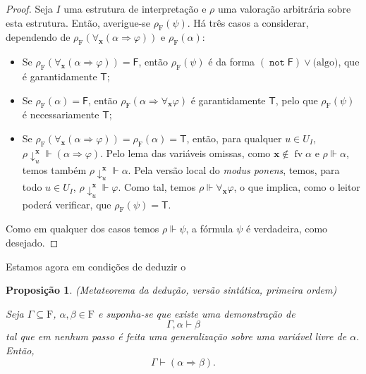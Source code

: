\documentclass{report}
\newtheorem{prop}{Proposição}
\theoremstyle{definition}
\theoremstyle{remark}
\renewcommand{\bf}[1]{\mathbf{#1}}
\newcommand{\F}{\mathrm{F}}
\newcommand{\lt}{\mathsf{T}}
\newcommand{\lf}{\mathsf{F}}
\DeclareMathOperator{\fv}{fv}
\DeclareMathOperator{\pnot}{\texttt{not}}
\newcommand{\imply}{\mathbin{\Rightarrow}}
\begin{document}
	\begin{proof}
	Seja $I$ uma estrutura de interpretação e $\rho$ uma valoração arbitrária sobre esta estrutura. Então, averigue-se $\rho_\F(\psi)$. Há três casos a considerar, dependendo de $\rho_\F(\forall_{\bf x}(\alpha \imply \varphi))$ e $\rho_\F(\alpha)$:
	
	\begin{itemize}
	\item Se $\rho_\F(\forall_{\bf x}(\alpha \imply \varphi)) = \lf$, então $\rho_\F(\psi)$ é da forma $(\pnot \lf) \lor \text{(algo)}$, que é garantidamente $\lt$;
	
	\item Se $\rho_\F(\alpha) = \lf$, então $\rho_\F(\alpha \imply \forall_{\bf x} \varphi)$ é garantidamente $\lt$, pelo que $\rho_\F(\psi)$ é necessariamente $\lt$;
	
	\item Se $\rho_\F(\forall_{\bf x}(\alpha \imply \varphi)) = \rho_\F(\alpha) = \lt$, então, para qualquer $u \in U_I$, $\rho\!\downarrow^{\bf x}_u \Vdash (\alpha \imply \varphi)$. Pelo lema das variáveis omissas, como $\bf x \not \in \fv \alpha$ e $\rho \Vdash \alpha$, temos também $\rho\!\downarrow^{\bf x}_u \Vdash \alpha$. Pela versão local do \emph{modus ponens}, temos, para todo $u \in U_I$, $\rho\!\downarrow^{\bf x}_u \Vdash \varphi$. Como tal, temos $\rho \Vdash \forall_{\bf x} \varphi$, o que implica, como o leitor poderá verificar, que $\rho_\F(\psi) = \lt$.
	\end{itemize}
	
	Como em qualquer dos casos temos $\rho \Vdash \psi$, a fórmula $\psi$ é verdadeira, como desejado.
	\end{proof}
	
	Estamos agora em condições de deduzir o
	
	\begin{prop}\label{fol:mtd}
	(Metateorema da dedução, versão sintática, primeira ordem)
	
	Seja $\Gamma \subseteq \F$, $\alpha, \beta \in \F$ e suponha-se que existe uma demonstração de
	\[\Gamma, \alpha \vdash \beta\]
	tal que em nenhum passo é feita uma generalização sobre uma variável livre de $\alpha$. Então,
	\[\Gamma \vdash (\alpha \imply \beta).\]
	\end{prop}
	
\end{document}
